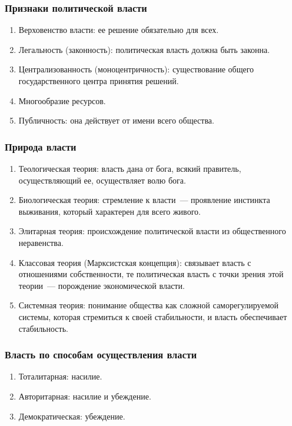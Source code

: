 \documentclass[12pt]{article}
\begin{document}
	\subsubsection{Признаки политической власти}
	\begin{enumerate}
		\item Верховенство власти: ее решение обязательно для всех.
		\item Легальность (законность): политическая власть должна быть законна.
		\item Централизованность (моноцентричность): существование общего государственного центра принятия решений.
		\item Многообразие ресурсов.
		\item Публичность: она действует от имени всего общества.
	\end{enumerate}
	\subsubsection{Природа власти}
	\begin{enumerate}
		\item Теологическая теория: власть дана от бога, всякий правитель, осуществляющий ее, осуществляет волю бога.
		\item Биологическая теория: стремление к власти~--- проявление инстинкта выживания, который характерен для всего живого.
		\item Элитарная теория: происхождение политической власти из общественного неравенства.
		\item Классовая теория (Марксистская концепция): связывает власть с отношениями собственности, те политическая власть с точки зрения этой теории~--- порождение экономической власти.
		\item Системная теория: понимание общества как сложной саморегулируемой системы, которая стремиться к своей стабильности, и власть обеспечивает стабильность.
	\end{enumerate}
	\subsubsection{Власть по способам осуществления власти}
	\begin{enumerate}
		\item Тоталитарная: насилие.
		\item Авторитарная: насилие и убеждение.
		\item Демократическая: убеждение.
	\end{enumerate}
\end{document}
